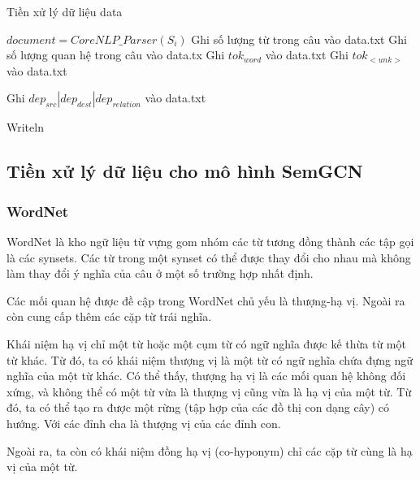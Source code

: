 \begin{algorithm}[H]
    \caption{Tiền xử lý dữ liệu data}
    \begin{algorithmic}[1]
		\State $document = CoreNLP\_Parser(S_i)$
			\State Ghi số lượng từ trong câu vào data.txt
			\State Ghi số lượng quan hệ trong câu vào data.tx
					\State Ghi $tok_{word}$ vào data.txt
				\Else
					\State Ghi $tok_{<unk>}$ vào data.txt
				\EndIf
			\EndFor

				\State Ghi $dep_{src}|dep_{dest}|dep_{relation}$ vào data.txt
			\EndFor
			
			\State Writeln
		\EndFor
    \end{algorithmic}
\end{algorithm}

\subsection{Tiền xử lý dữ liệu cho mô hình SemGCN}

\subsubsection{WordNet}

WordNet là kho ngữ liệu từ vựng gom nhóm các từ tương đồng thành các tập gọi là các synsets. Các từ trong một synset có thể được thay đổi cho nhau mà không làm thay đổi ý nghĩa của câu ở một số trường hợp nhất định.

Các mối quan hệ được đề cập trong WordNet chủ yếu là thượng-hạ vị. Ngoài ra còn cung cấp thêm các cặp từ trái nghĩa.

Khái niệm hạ vị chỉ một từ hoặc một cụm từ có ngữ nghĩa được kế thừa từ một từ khác. Từ đó, ta có khái niệm thượng vị là một từ có ngữ nghĩa chứa đựng ngữ nghĩa của một từ khác. Có thể thấy, thượng \- hạ vị là các mối quan hệ không đối xứng, và không thể có một từ vừa là thượng vị cũng vừa là hạ vị của một từ. Từ đó, ta có thể tạo ra được một rừng (tập hợp của các đồ thị con dạng cây) có hướng. Với các đỉnh cha là thượng vị của các đỉnh con.

Ngoài ra, ta còn có khái niệm đồng hạ vị (co-hyponym) chỉ các cặp từ cùng là hạ vị của một từ.

